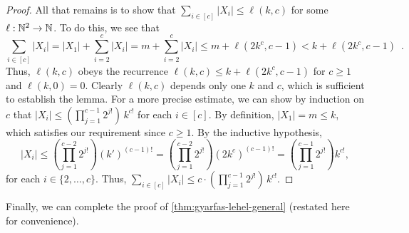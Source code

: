 \documentclass{patmorin}
\begin{document}
\begin{proof}
All that remains is to show that $\sum_{i\in[c]}|X_i|\le\ell(k,c)$ for some $\ell:\mathbb{N}^2\to\mathbb{N}$.  To do this, we see that
\[
  \sum_{i\in[c]} |X_i| = |X_1| + \sum_{i=2}^{c}|X_i|
 = m + \sum_{i=2}^{c}|X_i|
 \le m + \ell(2k^c,c-1)
 < k + \ell(2k^c,c-1) \enspace .
\]
Thus, $\ell(k,c)$ obeys the recurrence $\ell(k,c)\le k + \ell(2k^c,c-1)$ for $c\ge 1$ and $\ell(k,0)=0$.  Clearly $\ell(k,c)$ depends only one $k$ and $c$, which is sufficient to establish the lemma.  For a more precise estimate, we can show by induction on $c$ that
$|X_i|\le (\prod_{j=1}^{c-1}2^{j!})\, k^{c!}$ for each $i\in[c]$.
By definition, $|X_1|=m\le k$, which satisfies our requirement since $c\ge 1$.  By the inductive hypothesis,
\[\textstyle
  |X_i|
   \le \left(\prod_{j=1}^{c-2}2^{j!}\right)(k')^{(c-1)!}
   = \left(\prod_{j=1}^{c-2}2^{j!}\right)(2k^c)^{(c-1)!}
   = \left(\prod_{j=1}^{c-1}2^{j!}\right)k^{c!} ,
\]
for each $i\in\{2,\ldots,c\}$.  Thus, $\sum_{i\in[c]}|X_i|\le c\cdot (\prod_{j=1}^{c-1}2^{j!})\, k^{c!}$.
\end{proof}

Finally, we can complete the proof of \cref{thm:gyarfas-lehel-general} (restated here for convenience).
\end{document}
